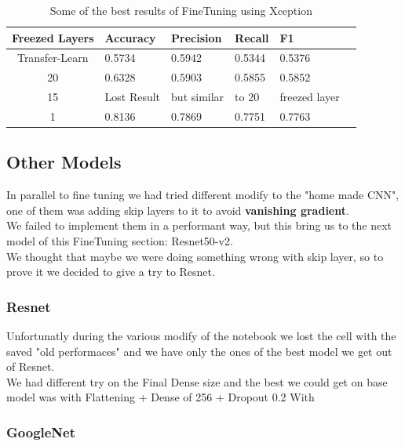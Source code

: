 \documentclass[10pt]{article}
\begin{document}
\begin{table}[ht]
  \centering
  \begin{adjustbox}{width=240}
  \small
  \begin{tabular}{|c|l|l|l|l|l}
  
  \hline \bf Freezed Layers & \bf Accuracy & \bf Precision & \bf Recall & \bf F1 \\ \hline
  Transfer-Learn & 0.5734 & 0.5942 & 0.5344 & 0.5376\\
  20 & 0.6328 & 0.5903 & 0.5855 & 0.5852\\
  15 & Lost Result & but similar &to 20 &freezed layer\\
  1 & 0.8136 & 0.7869 & 0.7751 & 0.7763\\
  \hline
  \end{tabular}
  \end{adjustbox}
  \caption{Some of the best results of FineTuning using Xception}
  \end{table}
\subsection{Other Models}
In parallel to fine tuning we had tried different modify to the "home made CNN", one of them was adding skip layers to it to avoid \textbf{vanishing gradient}.\\
We failed to implement them in a performant way, but this bring us to the next model of this FineTuning section: Resnet50-v2.\\
We thought that maybe we were doing something wrong with skip layer, so to prove it we decided to give a try to Resnet.
\subsubsection{Resnet}
Unfortunatly during the various modify of the notebook we lost the cell with the saved "old performaces" and we have only the ones of the best model we get out of Resnet.\\
We had different try on the Final Dense size and the best we could get on base model was with Flattening + Dense of 256 + Dropout 0.2
With 
\subsubsection{GoogleNet}
\end{document}

